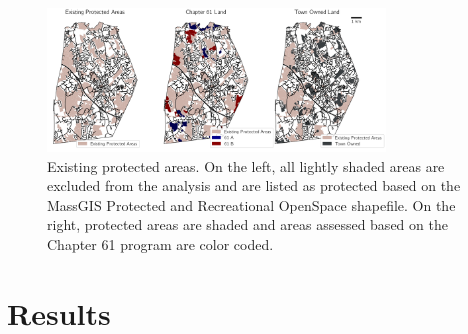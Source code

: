 \documentclass[12pt, stu, floatsintext,table]{apa7}
\begin{document}
\begin{figure}[hbtp]
    \centering
    \includegraphics[width = 0.8\textwidth]{figures/existing_prot.png}
    \caption{Existing protected areas. On the left, all lightly shaded areas are excluded from the analysis and are listed as protected based on the MassGIS Protected and Recreational OpenSpace shapefile. On the right, protected areas are shaded and areas assessed based on the Chapter 61 program are color coded.}
\end{figure}
\section{Results}
\end{document}
